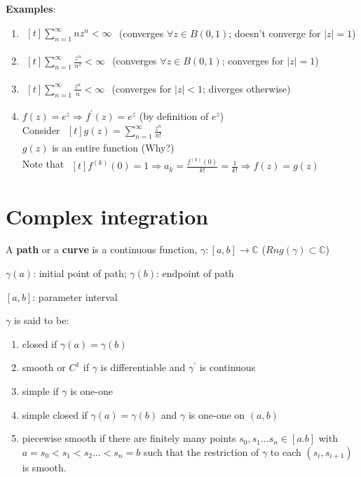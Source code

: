 \documentclass{article}
\begin{document}
\begin{flushleft}
\textbf{Examples}: 
\begin{enumerate}
\item $\begin{aligned}[t] \sum_{n=1}^{\infty} nz^n <\infty \end{aligned}$ \: (converges $\forall z \in B(0,1)$; doesn't converge for $|z|=1$) 
\item $\begin{aligned}[t] \sum_{n=1}^{\infty} \frac{z^n}{n^2} <\infty \end{aligned}$ \:(converges $\forall z\in B(0,1)$; converges for $|z|=1$)
\item $\begin{aligned}[t] \sum_{n=1}^{\infty} \frac{z^n}{n} <\infty \end{aligned}$ \:(converges for $|z|<1$; diverges otherwise)
\item $f(z)=e^z \Rightarrow f^{'}(z)=e^z$ (by definition of $e^z$)\\
Consider $\begin{aligned}[t] g(z)=\sum_{n=1}^{\infty} \frac{z^n}{n!}\end{aligned}$ \\
$g(z)$ is an entire function (Why?)\\
Note that $\begin{aligned}[t] f^{(k)}(0)=1\Rightarrow a_k=\frac{f^{(k)}(0)}{k!}=\frac{1}{k!}\Rightarrow f(z)=g(z) \end{aligned}$
\end{enumerate}
\clearpage

\section{Complex integration}

A \textbf{path} or a \textbf{curve} is a continuous function, $\gamma:[a,b]\rightarrow \mathds{C}$ 
($Rng(\gamma)\subset \mathds{C}$) 

$\gamma(a)$: initial point of path; $\gamma(b)$: endpoint of path

$[a,b]$: parameter interval 

$\gamma$ is said to be:
\begin{enumerate}
    \item closed if $\gamma(a)=\gamma(b)$
    \item smooth or $C^1$ if $\gamma$ is differentiable and $\gamma^{'}$ is continuous
    \item simple if $\gamma$ is one-one
    \item simple closed if $\gamma(a)=\gamma(b)$ and $\gamma$ is one-one on $(a,b)$
    \item piecewise smooth if there are finitely many points $s_0,s_1 \dots s_n\in [a.b]$ with $a=s_0<s_1<s_2 \dots <s_n=b$ such that the restriction of $\gamma$ to each $(s_i,s_{i+1})$ is smooth.


\end{enumerate}
\end{flushleft}
\end{document}
